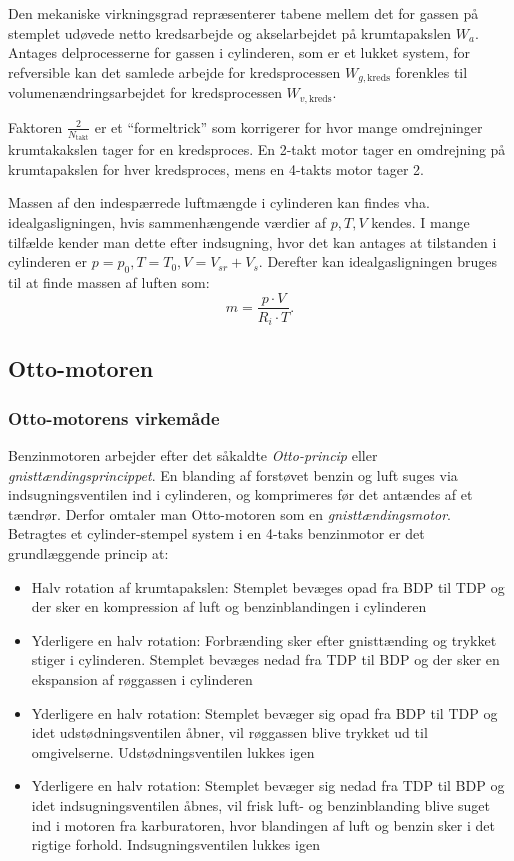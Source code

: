 Den mekaniske virkningsgrad repræsenterer tabene mellem det for gassen på stemplet udøvede netto kredsarbejde og akselarbejdet på krumtapakslen $W_a$. Antages delprocesserne for gassen i cylinderen, som er et lukket system, for refversible kan det samlede arbejde for kredsprocessen $W_{g, \mathrm{kreds}}$ forenkles til volumenændringsarbejdet for kredsprocessen $W_{v, \mathrm{kreds}}$.

Faktoren $\frac{2}{N_{\mathrm{takt}}}$ er et ``formeltrick'' som korrigerer for hvor mange omdrejninger krumtakakslen tager for en kredsproces. En 2-takt motor tager en omdrejning på krumtapakslen for hver kredsproces, mens en 4-takts motor tager 2.

Massen af den indespærrede luftmængde i cylinderen kan findes vha. idealgasligningen, hvis sammenhængende værdier af $p, T, V$ kendes. I mange tilfælde kender man dette efter indsugning, hvor det kan antages at tilstanden i cylinderen er $p = p_0, T = T_0, V = V_{s r} + V_s$. Derefter kan idealgasligningen bruges til at finde massen af luften som:
\[ 
m = \frac{p \cdot V}{R_i \cdot T}
.\]

\subsection{Otto-motoren}

\subsubsection{Otto-motorens virkemåde}
Benzinmotoren arbejder efter det såkaldte \textit{Otto-princip} eller \textit{gnisttændingsprincippet}. En blanding af forstøvet benzin og luft suges via indsugningsventilen ind i cylinderen, og komprimeres før det antændes af et tændrør. Derfor omtaler man Otto-motoren som en \textit{gnisttændingsmotor}. Betragtes et cylinder-stempel system i en 4-taks benzinmotor er det grundlæggende princip at:
\begin{itemize}
  \item Halv rotation af krumtapakslen: Stemplet bevæges opad fra BDP til TDP og der sker en kompression af luft og benzinblandingen i cylinderen
  \item Yderligere en halv rotation: Forbrænding sker efter gnisttænding og trykket stiger i cylinderen. Stemplet bevæges nedad fra TDP til BDP og der sker en ekspansion af røggassen i cylinderen
  \item Yderligere en halv rotation: Stemplet bevæger sig opad fra BDP til TDP og idet udstødningsventilen åbner, vil røggassen blive trykket ud til omgivelserne. Udstødningsventilen lukkes igen
  \item Yderligere en halv rotation: Stemplet bevæger sig nedad fra TDP til BDP og idet indsugningsventilen åbnes, vil frisk luft- og benzinblanding blive suget ind i motoren fra karburatoren, hvor blandingen af luft og benzin sker i det rigtige forhold. Indsugningsventilen lukkes igen
\end{itemize}

